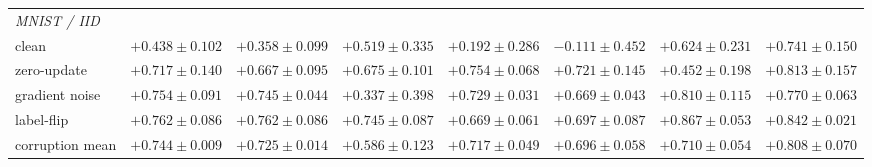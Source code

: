 \documentclass[letterpaper]{article} %
\theoremstyle{plain}
\begin{document}
\begin{table}[t]
\begin{tabular}{lccccccc}
\hline
\multicolumn{8}{l}{\emph{MNIST / IID}} \\
clean & $+0.438\pm0.102$ & $+0.358\pm0.099$ & $+0.519\pm0.335$ & $+0.192\pm0.286$ & $-0.111\pm0.452$ & $+0.624\pm0.231$ & $+0.741\pm0.150$ \\
zero-update & $+0.717\pm0.140$ & $+0.667\pm0.095$ & $+0.675\pm0.101$ & $+0.754\pm0.068$ & $+0.721\pm0.145$ & $+0.452\pm0.198$ & $+0.813\pm0.157$ \\
gradient noise & $+0.754\pm0.091$ & $+0.745\pm0.044$ & $+0.337\pm0.398$ & $+0.729\pm0.031$ & $+0.669\pm0.043$ & $+0.810\pm0.115$ & $+0.770\pm0.063$ \\
label-flip & $+0.762\pm0.086$ & $+0.762\pm0.086$ & $+0.745\pm0.087$ & $+0.669\pm0.061$ & $+0.697\pm0.087$ & $+0.867\pm0.053$ & $+0.842\pm0.021$ \\
corruption mean & $+0.744\pm0.009$ & $+0.725\pm0.014$ & $+0.586\pm0.123$ & $+0.717\pm0.049$ & $+0.696\pm0.058$ & $+0.710\pm0.054$ & $+0.808\pm0.070$ \\
\hline
\end{tabular}
\end{table}
\end{document}
